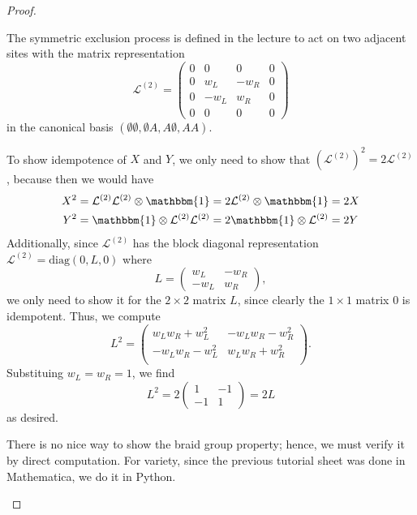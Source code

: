 \begin{proof}
	\begin{parts}
	\item The symmetric exclusion process is defined in the lecture to act on two adjacent sites with the matrix representation
		\[
			\mathcal{L}^{(2)} = \begin{pmatrix} 0 & 0 & 0 & 0 \\ 0 & w_L & -w_R & 0 \\ 0 & -w_L & w_R & 0 \\ 0 & 0 & 0 & 0 \end{pmatrix} 
		\] 
		in the canonical basis $(\emptyset\emptyset, \emptyset A, A\emptyset, A A)$.

		To show idempotence of $X$ and $Y$, we only need to show that $(\mathcal{L}^{(2)})^2=2\mathcal{L}^{(2)}$, because then we would have
		\begin{align*}
			X^2&= \mathcal{L}^{(2)}\mathcal{L}^{(2)}\otimes \mathbbm{1}=2\mathcal{L}^{(2)}\otimes \mathbbm{1}=2X\\
			Y^2&= \mathbbm{1}\otimes\mathcal{L}^{(2)}\mathcal{L}^{(2)}=2\mathbbm{1}\otimes\mathcal{L}^{(2)}=2Y
		\end{align*}
		Additionally, since $\mathcal{L}^{(2)}$ has the block diagonal representation $\mathcal{L}^{(2)}=\text{diag}(0, L, 0)$ where
		\[
			L = \begin{pmatrix} w_L & -w_R \\ -w_L & w_R \end{pmatrix} 
		,\]
		we only need to show it for the $2\times 2$ matrix $L$, since clearly the $1\times 1$ matrix 0 is idempotent. Thus, we compute
		\[
		L^2 =\left(
\begin{array}{cc}
 w_L w_R+w_L^2 & -w_L w_R-w_R^2 \\
 -w_L w_R-w_L^2 & w_L w_R+w_R^2 \\
\end{array}
\right) 
		.\] 
		Substituing $w_L=w_R=1$, we find
		\[
			L^2 = 2 \begin{pmatrix} 1 & -1 \\ -1 & 1 \end{pmatrix}=2L 
		\] 
		as desired.
		
		There is no nice way to show the braid group property; hence, we must verify it by direct computation. For variety, since the previous tutorial sheet was done in Mathematica, we do it in Python.
			

\end{parts}
\end{proof}
